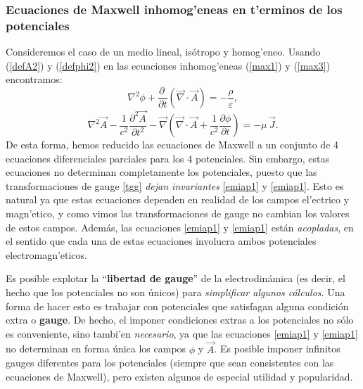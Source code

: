 \subsubsection{Ecuaciones de Maxwell inhomog'eneas en t'erminos de los
potenciales}
Consideremos el caso de un medio lineal, isótropo y homog'eneo. Usando (\ref{defA2}) y (\ref{defphi2}) en las ecuaciones inhomog'eneas (\ref{max1}) y (\ref{max3}) encontramos:
\begin{equation}\label{emiap1}
 \nabla^2\phi+\frac{\partial\ }{\partial t}\left(\vec{\nabla}\cdot\vec{A}\right)=-\frac{\rho}{\varepsilon},
\end{equation}
\begin{equation}\label{emiap2}
 \nabla^2\vec{A}-\frac{1}{c^2}\frac{\partial^2\vec{A}}{\partial t^2}-\vec{\nabla}\left(\vec{\nabla}\cdot\vec{A}+\frac{1}{c^2}\frac{\partial\phi }{\partial t}\right)=-\mu\,\vec{J}.
\end{equation}
De esta forma, hemos reducido las ecuaciones de Maxwell a un conjunto de 4 ecuaciones diferenciales parciales para los 4 potenciales. Sin embargo, estas ecuaciones no determinan completamente los potenciales, puesto que las transformaciones de gauge \eqref{tgg} \textit{dejan invariantes} \eqref{emiap1} y \eqref{emiap1}. Esto es natural ya que estas ecuaciones dependen en realidad de los campos el'ectrico y magn'etico, y como vimos las transformaciones de gauge no cambian los valores de estos campos. Además, las ecuaciones \eqref{emiap1} y \eqref{emiap1} están \textit{acopladas}, en el sentido que cada una de estas ecuaciones involucra ambos potenciales electromagn'eticos.

Es posible explotar la ``\textbf{libertad de gauge}'' de la electrodinámica (es decir, el hecho que los potenciales no son únicos) para \textit{simplificar algunos cálculos}. Una forma de hacer esto es trabajar con potenciales que satisfagan alguna condición extra o \textbf{gauge}. De hecho, el imponer condiciones extras a los potenciales no sólo es conveniente, sino tambi'en \textit{necesario}, ya que las ecuaciones \eqref{emiap1} y \eqref{emiap1} no determinan en forma única los campos $\phi$ y $\vec{A}$. Es posible imponer infinitos gauges diferentes para los potenciales (siempre que sean consistentes con las ecuaciones de Maxwell), pero existen algunos de especial utilidad y popularidad.

